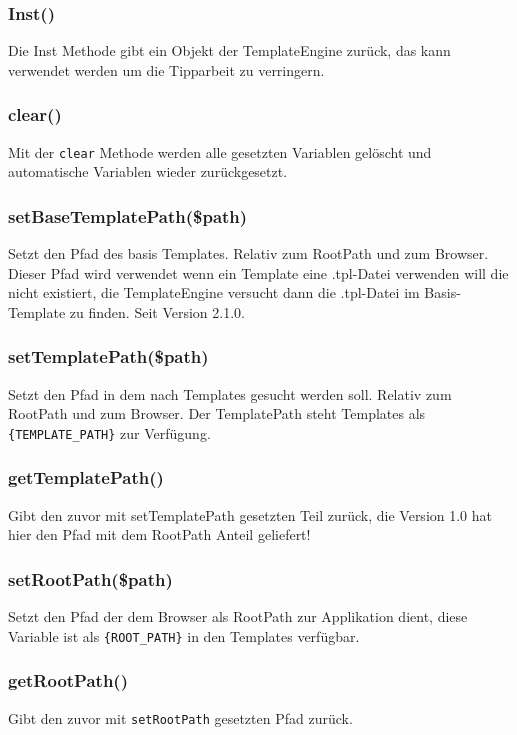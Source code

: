 \documentclass[a4paper,10pt]{article}
\begin{document}
\subsubsection{Inst()}
Die Inst Methode gibt ein Objekt der TemplateEngine zur\"uck, das kann verwendet werden um die Tipparbeit zu verringern.

\subsubsection{clear()}
Mit der {\tt clear} Methode werden alle gesetzten Variablen gel\"oscht und automatische Variablen wieder zur\"uckgesetzt.

\subsubsection{setBaseTemplatePath(\$path)}
Setzt den Pfad des basis Templates. Relativ zum RootPath und zum Browser.
Dieser Pfad wird verwendet wenn ein Template eine .tpl-Datei verwenden will die nicht existiert,
die TemplateEngine versucht dann die .tpl-Datei im Basis-Template zu finden. Seit Version 2.1.0.

\subsubsection{setTemplatePath(\$path)}
Setzt den Pfad in dem nach Templates gesucht werden soll. Relativ zum RootPath und zum Browser.
Der TemplatePath steht Templates als {\tt \{TEMPLATE\_PATH\}} zur Verf\"ugung.

\subsubsection{getTemplatePath()}
Gibt den zuvor mit setTemplatePath gesetzten Teil zur\"uck, die Version 1.0 hat hier den Pfad mit dem RootPath Anteil geliefert!

\subsubsection{setRootPath(\$path)}
Setzt den Pfad der dem Browser als RootPath zur Applikation dient, diese Variable ist als {\tt \{ROOT\_PATH\}} in den Templates verf\"ugbar.

\subsubsection{getRootPath()}
Gibt den zuvor mit {\tt setRootPath} gesetzten Pfad zur\"uck.
\end{document}
